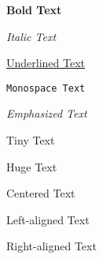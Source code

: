 \documentclass{article}
\begin{document}
\textbf{Bold Text}

\textit{Italic Text}

\underline{Underlined Text}

\texttt{Monospace Text}

\emph{Emphasized Text}

{\tiny Tiny Text}

{\Huge Huge Text}

\begin{center}
Centered Text
\end{center}

\begin{flushleft}
Left-aligned Text
\end{flushleft}

\begin{flushright}
Right-aligned Text
\end{flushright}
\end{document}
